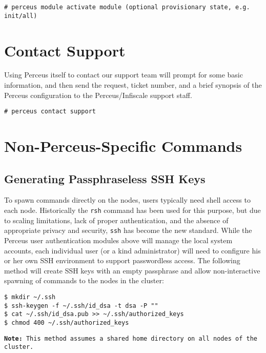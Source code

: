 \documentclass[10pt,letterpaper]{report}
\begin{document}
\begin{verbatim}
# perceus module activate module (optional provisionary state, e.g. init/all)
\end{verbatim}

\section{Contact Support}

Using Perceus itself to contact our support team will prompt for some basic
information, and then send the request, ticket number, and a brief synopsis of
the Perceus configuration to the Perceus/Infiscale support staff.

\begin{verbatim}
# perceus contact support
\end{verbatim}

\section{Non-Perceus-Specific Commands}

\subsection{Generating Passphraseless SSH Keys}

To spawn commands directly on the nodes, users typically need shell access to
each node.  Historically the {\tt rsh} command has been used for this purpose,
but due to scaling limitations, lack of proper authentication, and the absence
of appropriate privacy and security, {\tt ssh} has become the new standard.
While the Perceus user authentication modules above will manage the local
system accounts, each individual user (or a kind administrator) will need to
configure his or her own SSH environment to support passwordless access.  The
following method will create SSH keys with an empty passphrase and allow
non-interactive spawning of commands to the nodes in the cluster:

\begin{verbatim}
$ mkdir ~/.ssh
$ ssh-keygen -f ~/.ssh/id_dsa -t dsa -P ""
$ cat ~/.ssh/id_dsa.pub >> ~/.ssh/authorized_keys
$ chmod 400 ~/.ssh/authorized_keys
\end{verbatim}

{\tt {\bf Note:} This method assumes a shared home directory on all nodes of
the cluster.}


%
%
%
%
%
\end{document}
